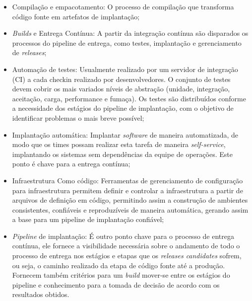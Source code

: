 \documentclass[twoside,english,brazilian]{UNISINOSartigo}
\begin{document}
\begin{itemize}
\item  Compilação e empacotamento: O processo de compilação que transforma código fonte em artefatos de implantação;
\item  \textit{Builds} e Entrega Contínua: A partir da integração contínua são disparados os processos do pipeline de entrega, como testes, implantação e gerenciamento de \textit{releases};
\item Automação de testes: Usualmente realizado por um servidor de integração (CI) a cada checkin realizado por desenvolvedores. O conjunto de testes devem cobrir os mais variados níveis de abstração (unidade, integração, aceitação, carga, performance e fumaça). Os testes são distribuídos conforme a necessidade dos estágios do pipeline de implantação, com o objetivo de identificar problemas o mais breve possível;
\item Implantação automática: Implantar \textit{software} de maneira automatizada, de modo que os times possam realizar esta tarefa de maneira \textit{self-service}, implantando os sistemas sem dependências da equipe de operações. Este ponto é chave para a entrega contínua;
\item Infraestrutura Como  código: Ferramentas de gerenciamento de configuração para infraestrutura permitem definir e controlar a infraestrutura a partir de arquivos de definição em código, permitindo assim a construção de ambientes consistentes, confiáveis e reproduzíveis de maneira automática, gerando assim a base para um pipeline de implantação confiável;
\item \textit{Pipeline} de implantação: É outro ponto chave para o processo de entrega contínua, ele fornece a visibilidade necessária sobre o andamento de todo o processo de entrega nos estágios e etapas que os \textit{releases candidates} sofrem, ou seja, o caminho realizado da etapa de código fonte até a produção. Fornecem também critérios para um \textit{build} mover-se entre os estágios do pipeline e conhecimento para a tomada de decisão de acordo com os resultados obtidos.
\end{itemize}
\end{document}
